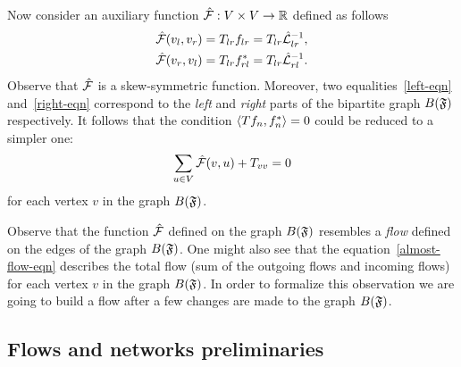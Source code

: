 \documentclass[12pt,oneside,a4paper]{amsart}
\begin{document}
      Now consider an auxiliary function $\mathcal{\hat{F}}: V \times V \to \mathbb{R}$ defined as follows
      \begin{align*}
        &\mathcal{\hat{F}}(v_l, v_r) = T_{lr} f_{lr} = T_{lr} \hat{\mathcal{L}}_{lr}^{-1},\\
        &\mathcal{\hat{F}}(v_r, v_l) = T_{lr} f^*_{rl} = T_{lr} \hat{\mathcal{L}}_{rl}^{-1}.
      \end{align*}
      Observe that $\mathcal{\hat{F}}$ is a skew-symmetric function.
      Moreover, two equalities~\eqref{left-eqn} and~\eqref{right-eqn} correspond to the \emph{left} and \emph{right}
        parts of the bipartite graph $B(\mathfrak{F})$ respectively.
      It follows that the condition $\langle Tf_n, f_n^* \rangle = 0$ could be reduced to a simpler one:
      \begin{equation}
        \label{almost-flow-eqn}
        \sum_{u \in V} \mathcal{\hat{F}}(v, u) + T_{vv} = 0
      \end{equation}
        for each vertex $v$ in the graph $B(\mathfrak{F})$.
      \begin{remark}
        Observe that the function $\mathcal{\hat{F}}$ defined on the graph $B(\mathfrak{F})$ resembles
          a \emph{flow} defined on the edges of the graph $B(\mathfrak{F})$.
        One might also see that the equation~\eqref{almost-flow-eqn} describes the total flow (sum of the outgoing flows and incoming flows) 
          for each vertex $v$ in the graph $B(\mathfrak{F})$.
        In order to formalize this observation we are going to build a flow
          after a few changes are made to the graph $B(\mathfrak{F})$.
      \end{remark}

    \medskip
    \subsection{Flows and networks preliminaries}
\end{document}

